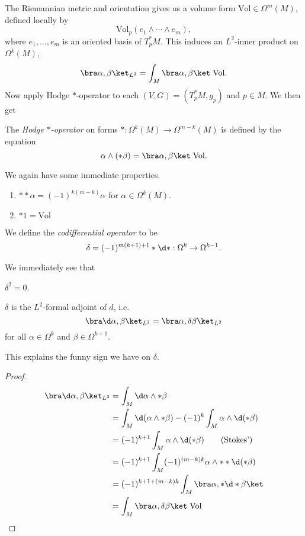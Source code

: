 \documentclass[a4paper]{article}
\newcommand\Vol{\mathrm{Vol}}
\begin{document}
The Riemannian metric and orientation gives us a volume form $\Vol \in \Omega^m(M)$, defined locally by
\[
  \Vol_p(e_1 \wedge \cdots \wedge e_m),
\]
where $e_1, \ldots, e_m$ is an oriented basis of $T_p^*M$. This induces an $L^2$-inner product on $\Omega^k(M)$,
\[
  \bra \alpha, \beta\ket_{L^2} = \int_M \bra \alpha, \beta\ket\;\Vol.
\]
Now apply Hodge $*$-operator to each $(V, G) = (T_p^* M, g_p)$ and $p \in M$. We then get
\begin{defi}\index{$*$}
  The \emph{Hodge $*$-operator} on forms $*: \Omega^k(M) \to \Omega^{m - k}(M)$ is defined by the equation
  \[
    \alpha \wedge (*\beta) = \bra \alpha ,\beta\ket \; \Vol.
  \]
\end{defi}

We again have some immediate properties.
\begin{prop}\leavevmode
  \begin{enumerate}
    \item $**\alpha = (-1)^{k(m - k)} \alpha$ for $\alpha \in \Omega^k(M)$.
    \item $*1 = \Vol$
  \end{enumerate}
\end{prop}

\begin{defi}\index{$\delta$}
  We define the \emph{codifferential operator} to be
  \[
    \delta = (-1)^{m(k + 1) + 1} *\d * : \Omega^k \to \Omega^{k - 1}.
  \]
\end{defi}

We immediately see that
\begin{prop}
  $\delta^2 = 0$.
\end{prop}

\begin{prop}
  $\delta$ is the $L^2$-formal adjoint of $d$, i.e.
  \[
    \bra \d \alpha, \beta\ket_{L^2} = \bra \alpha, \delta \beta\ket_{L^2}
  \]
  for all $\alpha \in \Omega^k$ and $\beta \in \Omega^{k + 1}$.
\end{prop}
This explains the funny sign we have on $\delta$.

\begin{proof}
  \begin{align*}
    \bra \d \alpha, \beta \ket_{L^2} &= \int_M \d \alpha \wedge * \beta\\
    &= \int_M \d (\alpha \wedge *\beta) - (-1)^k \int_M \alpha \wedge \d (*\beta)\\
    &= (-1)^{k + 1} \int_M \alpha \wedge \d (*\beta)\tag{Stokes'}\\
    &= (-1)^{k + 1} \int_M (-1)^{(m - k)k} \alpha \wedge **\d (*\beta)\\
    &= (-1)^{k + 1 + (m - k)k} \int_M \bra \alpha, *\d*\beta\ket\\
    &= \int_M \bra \alpha, \delta \beta \ket\;\Vol\qedhere
  \end{align*}
\end{proof}
\end{document}
